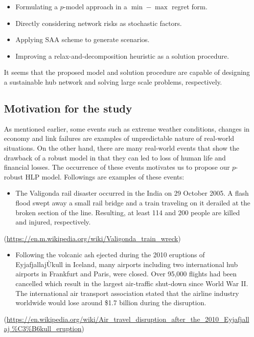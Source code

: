 \documentclass[review]{elsarticle}
\begin{document}
\begin{itemize}
\item  Formulating a $p$-model approach in a $\min-\max$ regret form. 
\item  Directly considering network risks as stochastic factors.
\item  Applying SAA scheme to generate scenarios.
\item  Improving a relax-and-decomposition heuristic as a solution procedure.
\end{itemize}

It seems that the proposed model and solution procedure are capable of designing a sustainable hub network and solving large scale problems, respectively.

\subsection{Motivation for the study}

As mentioned earlier, some events such as extreme weather conditions, changes in economy and link failures are examples of unpredictable nature of real-world situations. On the other hand, there are many real-world events that show the drawback of a robust model in that they can led to loss of human life and financial losses. The occurrence of these events motivates us to propose our $p$-robust HLP model. Followings are examples of these events:

\begin{itemize}
\item  The Valigonda rail disaster occurred in the India on 29 October 2005. A flash flood swept away a small rail bridge and a train traveling on it derailed at the broken section of the line. Resulting, at least 114 and 200 people are killed and injured, respectively.
\end{itemize}

(\url{https://en.m.wikipedia.org/wiki/Valigonda\_train\_wreck})

\begin{itemize}
\item  Following the volcanic ash ejected during the 2010 eruptions of EyjafjallajÙkull in Iceland, many airports including two international hub airports in Frankfurt and Paris, were closed. Over 95,000 flights had been cancelled which result in the largest air-traffic shut-down since World War II. The international air transport association stated that the airline industry worldwide would lose around \$1.7 billion during the disruption.
\end{itemize}
(\url{https://en.wikipedia.org/wiki/Air\_travel\_disruption\_after\_the\_2010\_Eyjafjallaj
\%C3\%B6kull\_eruption})
\end{document}
